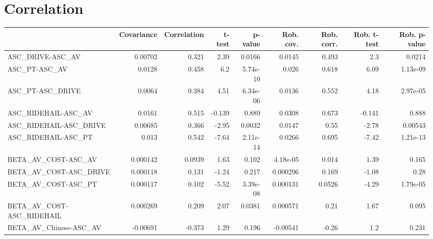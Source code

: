 \section{Correlation}
\begin{tabular}{lrrrrrrrr}
\toprule
{} &  Covariance &  Correlation &   t-test &  p-value &  Rob. cov. &  Rob. corr. &  Rob. t-test &  Rob. p-value \\
\midrule
ASC\_DRIVE-ASC\_AV                                   &     0.00702 &        0.321 &     2.39 &   0.0166 &     0.0145 &       0.493 &          2.3 &        0.0214 \\
ASC\_PT-ASC\_AV                                      &      0.0128 &        0.458 &      6.2 & 5.74e-10 &      0.026 &       0.618 &         6.09 &      1.13e-09 \\
ASC\_PT-ASC\_DRIVE                                   &      0.0064 &        0.384 &     4.51 & 6.34e-06 &     0.0136 &       0.552 &         4.18 &      2.97e-05 \\
ASC\_RIDEHAIL-ASC\_AV                                &      0.0161 &        0.515 &   -0.139 &    0.889 &     0.0308 &       0.673 &       -0.141 &         0.888 \\
ASC\_RIDEHAIL-ASC\_DRIVE                             &     0.00685 &        0.366 &    -2.95 &   0.0032 &     0.0147 &        0.55 &        -2.78 &       0.00543 \\
ASC\_RIDEHAIL-ASC\_PT                                &       0.013 &        0.542 &    -7.64 & 2.11e-14 &     0.0266 &       0.695 &        -7.42 &      1.21e-13 \\
BETA\_AV\_COST-ASC\_AV                                &    0.000142 &       0.0939 &     1.63 &    0.102 &   4.18e-05 &       0.014 &         1.39 &         0.165 \\
BETA\_AV\_COST-ASC\_DRIVE                             &    0.000118 &        0.131 &    -1.24 &    0.217 &   0.000296 &       0.169 &        -1.08 &          0.28 \\
BETA\_AV\_COST-ASC\_PT                                &    0.000117 &        0.102 &    -5.52 & 3.39e-08 &   0.000131 &      0.0526 &        -4.29 &      1.79e-05 \\
BETA\_AV\_COST-ASC\_RIDEHAIL                          &    0.000269 &        0.209 &     2.07 &   0.0381 &   0.000571 &        0.21 &         1.67 &         0.095 \\
BETA\_AV\_Chinese-ASC\_AV                             &    -0.00691 &       -0.373 &     1.29 &    0.196 &   -0.00541 &       -0.26 &          1.2 &         0.231 \\

\end{tabular}
